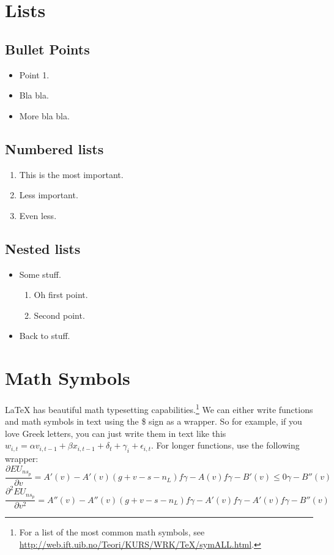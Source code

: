 \documentclass[11pt,letterpaper,oneside]{article} %
\begin{document}
\normalsize

\section{Lists}
\subsection{Bullet Points}
\begin{itemize}
\item Point 1.
\item Bla bla.
\item More bla bla.
\end{itemize}

\subsection{Numbered lists}
\begin{enumerate}
\item This is the most important.
\item Less important.
\item Even less.
\end{enumerate}

\subsection{Nested lists}
\begin{itemize}
\item Some stuff.
	\begin{enumerate}
	\item Oh first point.
	\item Second point.
	\end{enumerate}
\item Back to stuff.
\end{itemize}

\section{Math Symbols}
{\LaTeX} has beautiful math typesetting capabilities.\footnote{For a list of the most common math symbols, see \url{http://web.ift.uib.no/Teori/KURS/WRK/TeX/symALL.html}.} We can either write functions and math symbols in text using the \$ sign as a wrapper. So for example, if you love Greek letters, you can just write them in text like this $w_{i,t} = \alpha v_{i, t-1} + \beta x_{i, t-1} + \delta_t + \gamma_i + \epsilon_{i, t}$. For longer functions, use the following wrapper:
\begin{equation}
\frac{\partial EU_{ns_p}}{\partial v}=A'(v)-A'(v)(g+v-s-n_L)f\gamma-A(v)f\gamma-B'(v)\leq0\gamma-B''(v)
\end{equation}
\begin{equation}
\frac{\partial^2 EU_{ns_p}}{\partial v^2}=A''(v)-A''(v)(g+v-s-n_L)f\gamma-A'(v)f\gamma-A'(v)f\gamma-B''(v)
\end{equation}
\end{document}
